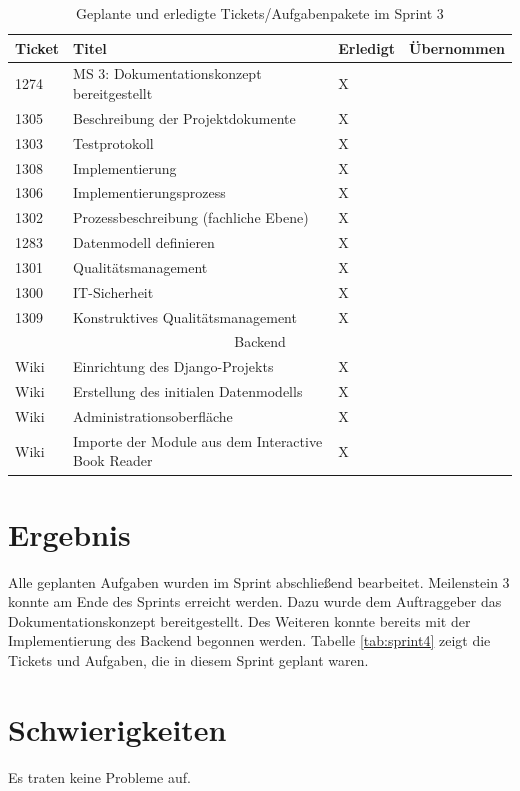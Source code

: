 \documentclass[a4paper,11pt,listof=numbered,glossary=totoc,parskip=half,toc=bib]{scrreprt}
\begin{document}
\begin{table}    
    \begin{tabularx}{\textwidth}{lXll}
			\toprule
			\textbf{Ticket} & \textbf{Titel} & \textbf{Erledigt} & \textbf{Übernommen} \\
			\midrule
1274	&	MS 3: Dokumentationskonzept bereitgestellt	&	X	&		\\
1305	&	Beschreibung der Projektdokumente	&	X	&		\\
1303	&	Testprotokoll	&	X	&		\\
1308	&	Implementierung	&	X	&		\\
1306	&	Implementierungsprozess	&	X	&		\\
1302	&	Prozessbeschreibung (fachliche Ebene)	&	X	&		\\
1283	&	Datenmodell definieren	&	X	&		\\
1301	&	Qualitätsmanagement	&	X	&		\\
1300	&	IT-Sicherheit	&	X	&		\\
1309	&	Konstruktives Qualitätsmanagement	&	X	&		\\
		\midrule
		\multicolumn{4}{c}{Backend}\\
		\midrule
Wiki	&	Einrichtung des Django-Projekts	&	X	&		\\
Wiki	&	Erstellung des initialen Datenmodells	&	X	&		\\
Wiki	&	Administrationsoberfläche	&	X	&		\\
Wiki	&	Importe der Module aus dem Interactive Book Reader	&	X	&		\\

			\bottomrule
		\end{tabularx}
\caption{Geplante und erledigte Tickets/Aufgabenpakete im Sprint 3}
\label{tab:sprint3}
\end{table}
    
    \section{Ergebnis}
    Alle geplanten Aufgaben wurden im Sprint abschließend bearbeitet. Meilenstein 3 konnte am Ende des Sprints erreicht werden. Dazu wurde dem Auftraggeber das Dokumentationskonzept bereitgestellt. Des Weiteren konnte bereits mit der Implementierung des Backend begonnen werden. Tabelle \ref{tab:sprint4} zeigt die Tickets und Aufgaben, die in diesem Sprint geplant waren.
    
    \section{Schwierigkeiten}
    Es traten keine Probleme auf. 
    
\end{document}
